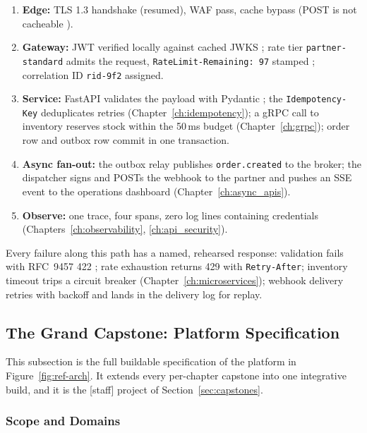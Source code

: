 \begin{enumerate}
  \item \textbf{Edge:} TLS 1.3 handshake (resumed), WAF pass, cache bypass
        (POST is not cacheable \cite{rfc9110}).
  \item \textbf{Gateway:} JWT verified locally against cached JWKS
        \cite{rfc7519}; rate tier \texttt{partner-standard} admits the
        request, \texttt{RateLimit-Remaining: 97} stamped
        \cite{ietf_ratelimit_headers}; correlation ID \texttt{rid-9f2}
        assigned.
  \item \textbf{Service:} FastAPI validates the payload with Pydantic
        \cite{pydanticdocs,fastapidocs}; the \texttt{Idempotency-Key}
        deduplicates retries (Chapter~\ref{ch:idempotency}); a gRPC call to
        inventory reserves stock within the 50\,ms budget
        (Chapter~\ref{ch:grpc}); order row and outbox row commit in one
        transaction.
  \item \textbf{Async fan-out:} the outbox relay publishes
        \texttt{order.created} to the broker; the dispatcher signs and POSTs
        the webhook to the partner and pushes an SSE event to the operations
        dashboard (Chapter~\ref{ch:async_apis}).
  \item \textbf{Observe:} one trace, four spans, zero log lines containing
        credentials (Chapters~\ref{ch:observability},
        \ref{ch:api_security}).
\end{enumerate}

Every failure along this path has a named, rehearsed response: validation
fails with RFC~9457 422 \cite{rfc9457}; rate exhaustion returns 429 with
\texttt{Retry-After}; inventory timeout trips a circuit breaker
\cite{nygard2018releaseit} (Chapter~\ref{ch:microservices}); webhook delivery
retries with backoff and lands in the delivery log for replay.

\subsection{The Grand Capstone: Platform Specification}
\label{sec:grand-capstone}

This subsection is the full buildable specification of the platform in
Figure~\ref{fig:ref-arch}. It extends every per-chapter capstone into one
integrative build, and it is the [staff] project of
Section~\ref{sec:capstones}.

\subsubsection{Scope and Domains}

